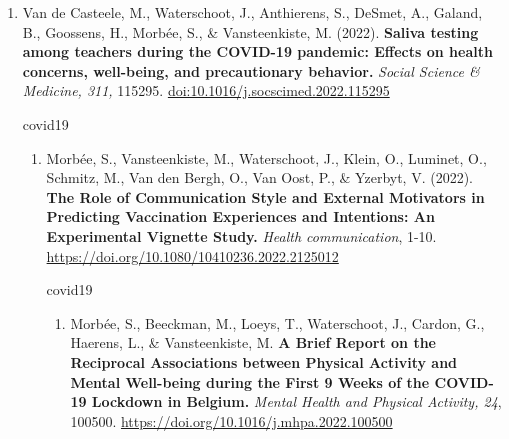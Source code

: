 \documentclass[
  twocolumn]{article}
\providecommand{\tightlist}{%
  \setlength{\itemsep}{0pt}\setlength{\parskip}{0pt}}
\begin{document}
\begin{enumerate}
\begin{enumerate}
\begin{enumerate}
\begin{enumerate}
\begin{enumerate}
\begin{enumerate}
\begin{enumerate}
\begin{enumerate}
\begin{enumerate}
\begin{enumerate}
\begin{enumerate}
                      \begin{enumerate}
                      \def\labelenumxii{\arabic{enumxii}.}
                      \tightlist
                      \item
                        Van de Casteele, M., Waterschoot, J.,
                        Anthierens, S., DeSmet, A., Galand, B.,
                        Goossens, H., Morbée, S., \& Vansteenkiste, M.
                        (2022). \textbf{Saliva testing among teachers
                        during the COVID-19 pandemic: Effects on health
                        concerns, well-being, and precautionary
                        behavior.} \emph{Social Science \& Medicine,
                        311,} 115295.
                        \url{doi:10.1016/j.socscimed.2022.115295}

                        covid19

                        \begin{enumerate}
                        \def\labelenumxiii{\arabic{enumxiii}.}
                        \tightlist
                        \item
                          Morbée, S., Vansteenkiste, M., Waterschoot,
                          J., Klein, O., Luminet, O., Schmitz, M., Van
                          den Bergh, O., Van Oost, P., \& Yzerbyt, V.
                          (2022). \textbf{The Role of Communication
                          Style and External Motivators in Predicting
                          Vaccination Experiences and Intentions: An
                          Experimental Vignette Study.} \emph{Health
                          communication}, 1-10.
                          \url{https://doi.org/10.1080/10410236.2022.2125012}

                          covid19

                          \begin{enumerate}
                          \def\labelenumxiv{\arabic{enumxiv}.}
                          \tightlist
                          \item
                            Morbée, S., Beeckman, M., Loeys, T.,
                            Waterschoot, J., Cardon, G., Haerens, L., \&
                            Vansteenkiste, M. \textbf{A Brief Report on
                            the Reciprocal Associations between Physical
                            Activity and Mental Well-being during the
                            First 9 Weeks of the COVID-19 Lockdown in
                            Belgium.} \emph{Mental Health and Physical
                            Activity, 24}, 100500.
                            \url{https://doi.org/10.1016/j.mhpa.2022.100500}


\end{enumerate}
\end{enumerate}
\end{enumerate}
\end{enumerate}
\end{enumerate}
\end{enumerate}
\end{enumerate}
\end{enumerate}
\end{enumerate}
\end{enumerate}
\end{enumerate}
\end{enumerate}
\end{enumerate}
\end{enumerate}
\end{document}
